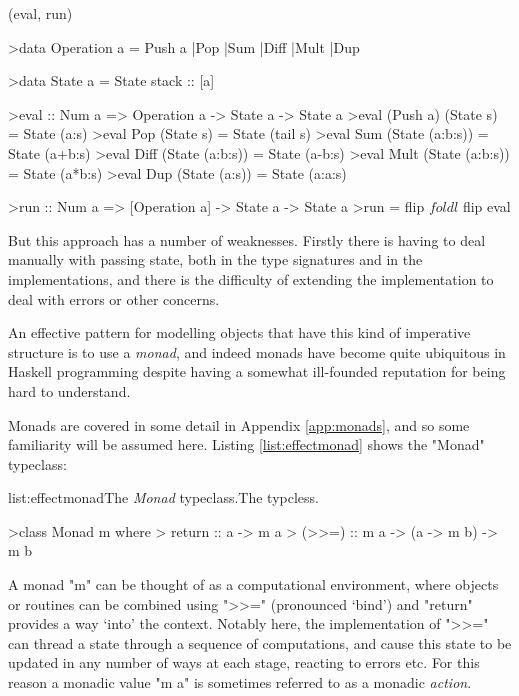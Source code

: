 \functions(eval, run)
\begin{haskell}

>data Operation a = Push a |Pop |Sum |Diff |Mult |Dup

>data State a = State {stack :: [a]}

>eval :: Num a => Operation a -> State a -> State a
>eval (Push a) (State s) = State (a:s)
>eval Pop  (State s) = State (tail s)
>eval Sum  (State (a:b:s)) = State (a+b:s)
>eval Diff (State (a:b:s)) = State (a-b:s)
>eval Mult (State (a:b:s)) = State (a*b:s)
>eval Dup  (State (a:s)) = State (a:a:s)

>run :: Num a => [Operation a] -> State a -> State a
>run = flip $ foldl $ flip eval

\end{haskell}
\noindent But this approach has a number of weaknesses. Firstly there is having to deal manually with passing state, both in the type signatures and in the implementations, and there is the difficulty of extending the implementation to deal with errors or other concerns.

An effective pattern for modelling objects that have this kind of imperative structure is to use a \emph{monad}, and indeed monads have become quite ubiquitous in Haskell programming despite having a somewhat ill-founded reputation for being hard to understand.

Monads are covered in some detail in Appendix \ref{app:monads}, and so some familiarity will be assumed here. Listing \ref{list:effectmonad} shows the "Monad" typeclass:

\vspace{-0.5em}
\begin{listing}{list:effectmonad}{The \emph{Monad} typeclass.}{The  typcless.}{}
\end{listing}\vspace{-1.5em}

\begin{haskell}

>class Monad m where
>  return :: a -> m a
>  (>>=) :: m a -> (a -> m b) -> m b

\end{haskell}
\noindent A monad "m" can be thought of as a computational environment, where objects or routines can be combined using ">>=" (pronounced `bind') and "return" provides a way `into' the context. Notably here, the implementation of ">>=" can thread a state through a sequence of computations, and cause this state to be updated in any number of ways at each stage, reacting to errors etc. For this reason a monadic value "m a" is sometimes referred to as a monadic \emph{action}.

